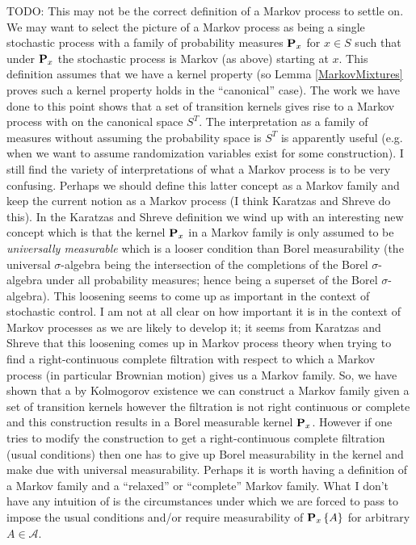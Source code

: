 TODO:  This may not be the correct definition of a Markov process to
settle on.   We may want to select the picture of a Markov process as
being a single stochastic process with a family of probability
measures $\probabilityop_x$ for $x \in S$ such that under $\probabilityop_x$ the
stochastic process is Markov (as above) starting at $x$.  This
definition assumes that we have a kernel property (so Lemma
\ref{MarkovMixtures} proves such a kernel property
holds in the ``canonical'' case).  The work we have done to this point
shows that a set of transition kernels gives rise to a Markov process
with on the canonical space $S^T$.  The interpretation as a family of measures
without assuming the probability space is $S^T$ is apparently useful (e.g. when we want to
assume randomization variables exist for some construction).  I still find the variety of
interpretations of what a Markov process is to be very confusing.
Perhaps we should define this latter concept as a Markov family and
keep the current notion as a Markov process (I think Karatzas and
Shreve do this).  In the Karatzas and Shreve definition we wind up
with an interesting new concept which is that the kernel
$\probabilityop_x$ in a Markov family is only assumed to be \emph{universally measurable}
which is a looser condition than Borel measurability (the universal
$\sigma$-algebra being the intersection of the completions of the
Borel $\sigma$-algebra under all probability measures; hence being a
superset of the Borel $\sigma$-algebra).  This loosening
seems to come up as important in the context of stochastic control.  I
am not at all clear on how important it is in the context of Markov
processes as we are likely to develop it; it seems from Karatzas and
Shreve that this loosening comes up in Markov process theory when
trying to find a right-continuous complete filtration with respect to which a
Markov process (in particular Brownian motion) gives us a Markov
family.  So, we have shown that a by Kolmogorov existence we can
construct a Markov family given a set of transition kernels however
the filtration is not right continuous or complete and this
construction results in a Borel measurable kernel $\probabilityop_x$.
However if one tries to modify the construction to get a
right-continuous complete filtration (usual conditions) then one has
to give up Borel measurability in the kernel and make due with
universal measurability.  Perhaps it is worth having a definition of a Markov family 
and a ``relaxed'' or ``complete'' Markov family.  What I don't have any intuition of 
is the circumstances under which we are forced to pass to impose the usual conditions and/or require measurability of $\sprobability{A}{x}$ for arbitrary $A \in \mathcal{A}$.  
